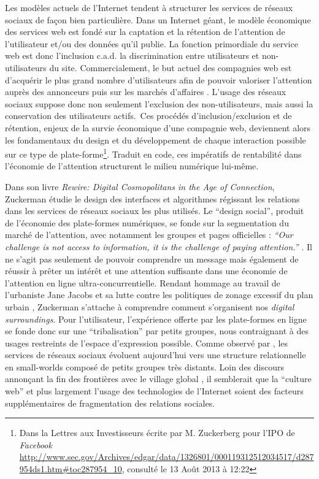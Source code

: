 Les modèles actuels de l’Internet tendent à structurer les services de réseaux sociaux de façon bien particulière. Dans un Internet géant, le modèle économique des services web est fondé sur la captation et la rétention de l'attention de l'utilisateur et/ou des données qu'il publie. La fonction primordiale du service web est donc l'inclusion c.a.d. la discrimination entre utilisateurs et non-utilisateurs du site. Commercialement, le but actuel des compagnies web est d'acquérir le plus grand nombre d'utilisateurs afin de pouvoir valoriser l’attention auprès des annonceurs puis sur les marchés d’affaires \citep{Ries2011}. L'usage des réseaux sociaux suppose donc non seulement l'exclusion des non-utilisateurs, mais aussi la conservation des utilisateurs actifs. Ces procédés d'inclusion/exclusion et de rétention, enjeux de la survie économique d'une compagnie web, deviennent alors les fondamentaux du design et du développement de chaque interaction possible sur ce type de plate-forme\footnote{Dans la Lettres aux Investisseurs écrite par M. Zuckerberg  pour l’IPO de \textit{Facebook} \url{http://www.sec.gov/Archives/edgar/data/1326801/000119312512034517/d287954ds1.htm\#toc287954_10}, consulté le 13 Août 2013 à 12:22}. Traduit en code, ces impératifs de rentabilité dans l’économie de l’attention structurent le milieu numérique lui-même.

Dans son livre \textit{Rewire: Digital Cosmopolitans in the Age of Connection}, Zuckerman étudie le design des interfaces et algorithmes régissant les relations dans les services de réseaux sociaux les plus utilisés. Le ``design social'', produit de l'économie des plate-formes numériques, se fonde sur la segmentation du marché de l’attention, avec notamment les groupes et pages officielles : \textit{``Our challenge is not access to information, it is the challenge of paying attention.''} \cite{Zuckerman2013}. Il ne s’agit pas seulement de pouvoir comprendre un message mais également de réussir à prêter un intérêt et une attention suffisante dans une économie de l’attention en ligne ultra-concurrentielle. Rendant hommage au travail de l’urbaniste Jane Jacobs et sa lutte contre les politiques de zonage excessif du plan urbain \citep{Jacobs1961}, Zuckerman s’attache à comprendre comment s’organisent nos \textit{digital surroundings}. Pour l'utilisateur, l’expérience offerte par les plate-formes en ligne se fonde donc sur une ``tribalisation'' par petits groupes, nous contraignant à des usages restreints de l'espace d'expression possible. Comme observé par \cite{Kumar2006}, les services de réseaux sociaux évoluent aujourd’hui vers une structure relationnelle en small-worlds composé de petits groupes très distants. Loin des discours annonçant la fin des frontières avec le village global \citep{Breton1997}, il semblerait que la ``culture web'' et plus largement l’usage des technologies de l’Internet soient des facteurs supplémentaires de fragmentation des relations sociales. 


